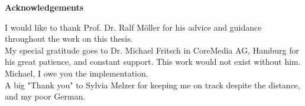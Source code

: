 \bigskip
\bigskip

\pagebreak\par
{\LARGE\noindent \textbf{Acknowledgements}}\\

\bigskip
\bigskip


I would like to thank Prof. Dr. Ralf M\"oller for his advice and guidance throughout the work on this thesis. \\

My special gratitude goes to Dr. Michael Fritsch in CoreMedia AG, Hamburg for his great patience, and constant support. This work would not exist without him. Michael, I owe you the implementation. \\

A big "Thank you" to Sylvia Melzer for keeping me on track despite the distance, and my poor German. \\


\pagebreak
